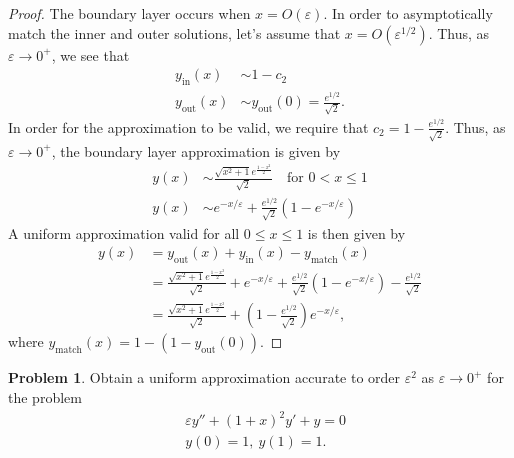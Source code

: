 \documentclass[12pt]{article}
\theoremstyle{definition}
\newtheorem{problem}{Problem}
\begin{document}
\begin{proof}
  The boundary layer occurs when $x=O(\varepsilon)$. In order to asymptotically match the inner and outer solutions,
  let's assume that $x=O(\varepsilon^{1/2})$. Thus, as $\varepsilon \to 0^+$, we see that
  \begin{align*}
    y_{\text{in}}(x) &\sim 1 - c_2 \\
    y_{\text{out}}(x) &\sim y_{\text{out}}(0) = \frac{e^{1/2}}{\sqrt{2}}.
  \end{align*}
  In order for the approximation to be valid, we require that $c_2 = 1 - \frac{e^{1/2}}{\sqrt{2}}$.
  Thus, as $\varepsilon \to 0^+$, the boundary layer approximation is given by
  \begin{align*}
    y(x) &\sim \frac{   \sqrt{x^2+1}e^{\frac{1-x^2}{2}}}{\sqrt{2}} \quad \text{for $0<x\leq 1$} \\
    y(x) &\sim e^{-x/\varepsilon} + \frac{e^{1/2}}{\sqrt{2}}\left(1-e^{-x/\varepsilon}\right)
  \end{align*}
  A uniform approximation valid for all $0\leq x \leq 1$ is then given by
  \begin{align*}
    y(x) &= y_{\text{out}}(x) + y_{\text{in}}(x) - y_{\text{match}}(x) \\
    &= \frac{   \sqrt{x^2+1}e^{\frac{1-x^2}{2}}}{\sqrt{2}} + e^{-x/\varepsilon} + \frac{e^{1/2}}{\sqrt{2}}\left(1-e^{-x/\varepsilon}\right) - \frac{e^{1/2}}{\sqrt{2}}\\
    &= \frac{   \sqrt{x^2+1}e^{\frac{1-x^2}{2}}}{\sqrt{2}} + \left(1 - \frac{e^{1/2}}{\sqrt{2}}\right)e^{-x/\varepsilon},
  \end{align*}
  where $y_{\text{match}}(x) = 1 - (1 -y_{\text{out}}(0))$.
\end{proof}
\newpage


\begin{problem}
  Obtain a uniform approximation accurate to order $\varepsilon ^2$ as $\varepsilon \to 0^+$
  for the problem
  \begin{align*}
      &\varepsilon y'' + (1+x)^2 y' + y = 0 \\
      &y(0) = 1,\ y(1) = 1.
  \end{align*}
\end{problem}
\end{document}
